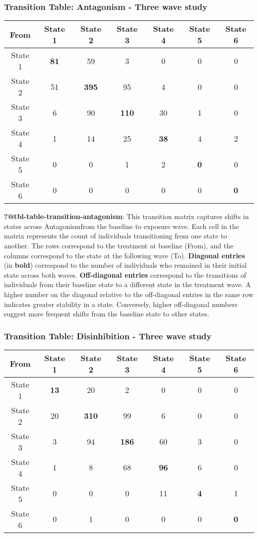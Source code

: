 \documentclass[
  singlecolumn]{article}
\begin{document}
\subsubsection{Transition Table: Antagonism - Three wave
study}\label{transition-table-antagonism---three-wave-study}

\begin{longtable}[]{@{}ccccccc@{}}
\toprule\noalign{}
From & State 1 & State 2 & State 3 & State 4 & State 5 & State 6 \\
\midrule\noalign{}
\endhead
\bottomrule\noalign{}
\endlastfoot
State 1 & \textbf{81} & 59 & 3 & 0 & 0 & 0 \\
State 2 & 51 & \textbf{395} & 95 & 4 & 0 & 0 \\
State 3 & 6 & 90 & \textbf{110} & 30 & 1 & 0 \\
State 4 & 1 & 14 & 25 & \textbf{38} & 4 & 2 \\
State 5 & 0 & 0 & 1 & 2 & \textbf{0} & 0 \\
State 6 & 0 & 0 & 0 & 0 & 0 & \textbf{0} \\
\end{longtable}

\textbf{?@tbl-table-transition-antagonism}: This transition matrix
captures shifts in states across Antagonismfrom the baseline to exposure
wave. Each cell in the matrix represents the count of individuals
transitioning from one state to another. The rows correspond to the
treatment at baseline (From), and the columns correspond to the state at
the following wave (To). \textbf{Diagonal entries} (in \textbf{bold})
correspond to the number of individuals who remained in their initial
state across both waves. \textbf{Off-diagonal entries} correspond to the
transitions of individuals from their baseline state to a different
state in the treatment wave. A higher number on the diagonal relative to
the off-diagonal entries in the same row indicates greater stability in
a state. Conversely, higher off-diagonal numbers suggest more frequent
shifts from the baseline state to other states.

\subsubsection{Transition Table: Disinhibition - Three wave
study}\label{transition-table-disinhibition---three-wave-study}

\begin{longtable}[]{@{}ccccccc@{}}
\toprule\noalign{}
From & State 1 & State 2 & State 3 & State 4 & State 5 & State 6 \\
\midrule\noalign{}
\endhead
\bottomrule\noalign{}
\endlastfoot
State 1 & \textbf{13} & 20 & 2 & 0 & 0 & 0 \\
State 2 & 20 & \textbf{310} & 99 & 6 & 0 & 0 \\
State 3 & 3 & 94 & \textbf{186} & 60 & 3 & 0 \\
State 4 & 1 & 8 & 68 & \textbf{96} & 6 & 0 \\
State 5 & 0 & 0 & 0 & 11 & \textbf{4} & 1 \\
State 6 & 0 & 1 & 0 & 0 & 0 & \textbf{0} \\
\end{longtable}
\end{document}

